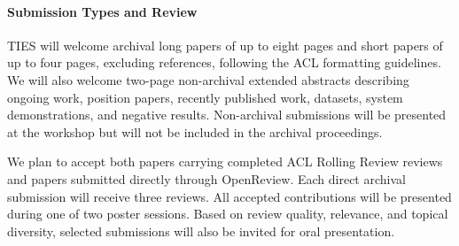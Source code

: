 \documentclass[11pt]{article}
\begin{document}
\paragraph{Submission Types and Review}

TIES will welcome archival long papers of up to eight pages and short
papers of up to four pages, excluding references, following the ACL
formatting guidelines. We will also welcome two-page non-archival
extended abstracts describing ongoing work, position papers, recently
published work, datasets, system demonstrations, and negative results.
Non-archival submissions will be presented at the workshop but will not
be included in the archival proceedings.

We plan to accept both papers carrying completed ACL Rolling Review
reviews and papers submitted directly through OpenReview. Each direct
archival submission will receive three reviews. All accepted
contributions will be presented during one of two poster sessions.
Based on review quality, relevance, and topical diversity, selected
submissions will also be invited for oral presentation.





\end{document}
